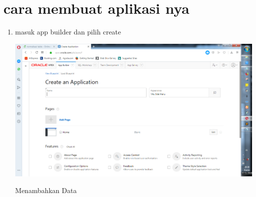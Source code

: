 \documentclass{article}
\begin{document}
       \section{cara membuat aplikasi nya}
 \begin{enumerate}
\item masuk app builder dan pilih create
    \begin{center}
         \centering
            \includegraphics[scale=0.27]{gambar/17.png}
        \caption{Menambahkan Data}
        \label{excel}
    \end{center}
        

\end{enumerate}
\end{document}
